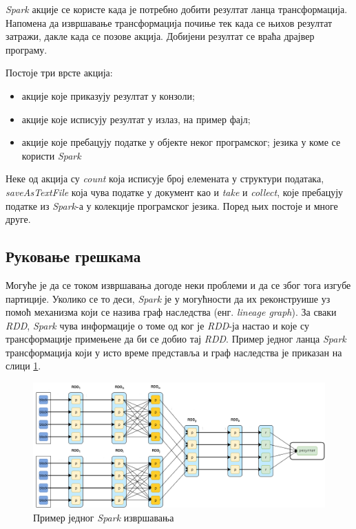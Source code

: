 \documentclass[12pt,oneside]{memoir}
\begin{document}
\textit{Spark} акције се користе када је потребно добити резултат ланца трансформација. Напомена да извршавање трансформација почиње тек када се њихов резултат затражи, дакле када се позове акција. Добијени резултат се враћа драјвер програму. \cite{spark_guide}

Постоје три врсте акција:
\begin{itemize}
\item акције које приказују резултат у конзоли;
\item акције које исписују резултат у излаз, на пример фајл;
\item акције које пребацују податке у објекте неког програмског; језика у коме се користи \textit{Spark}
\end{itemize}

Неке од акција су \textit{count} која исписује број елемената у структури података, \textit{saveAsTextFile} која чува податке у документ као и \textit{take} и \textit{collect}, које пребацују податке из \textit{Spark}-а у колекције програмског језика. Поред њих постоје и многе друге. \cite{spark_rdd}

\subsection{Руковање грешкама}
\label{subsec:spark_dags}

Могуће је да се током извршавања догоде неки проблеми и да се због тога изгубе партиције. Уколико се то деси, \textit{Spark} је у могућности да их реконструише уз помоћ механизма који се назива граф наследства (енг. \textit{lineage graph}). За сваки \textit{RDD}, \textit{Spark} чува информације о томе од ког је \textit{RDD}-ја настао и које су трансформације примењене да би се добио тај \textit{RDD}. Пример једног ланца \textit{Spark} трансформација који у исто време представља и граф наследства је приказан на  слици \ref{fig:sprk_ppln}.

\begin{figure}[!ht]
  \centering
  \includegraphics[width=1\textwidth]{pictures/spark_pipeline.png}
  \caption{Пример једног \textit{Spark} извршавања}
  \label{fig:sprk_ppln}
\end{figure}
\end{document}
